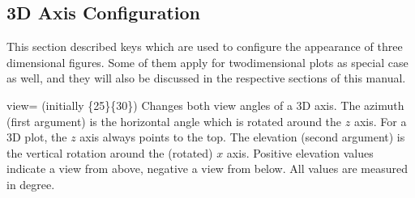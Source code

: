 

\subsection{3D Axis Configuration}
This section described keys which are used to configure the appearance of three dimensional figures. Some of them apply for twodimensional plots as special case as well, and they will also be discussed in the respective sections of this manual.

\begin{pgfplotskey}{view= (initially \{25\}\{30\})}
	Changes both view angles of a 3D axis. The azimuth (first argument) is the horizontal angle which is rotated around the $z$ axis. For a 3D plot, the $z$ axis always points to the top. The elevation (second argument) is the vertical rotation around the (rotated) $x$ axis. Positive elevation values indicate a view from above, negative a view from below. All values are measured in degree.

\pgfplotsexpensiveexample
\begin{codeexample}[]
\end{codeexample}

\pgfplotsexpensiveexample
\begin{codeexample}[]
\end{codeexample}

\pgfplotsexpensiveexample
\begin{codeexample}[]
\end{codeexample}
\end{pgfplotskey}


